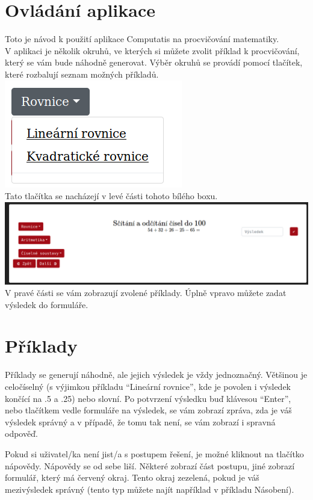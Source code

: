 \documentclass[
]{article}
\begin{document}
\section{Ovládání aplikace}
Toto je návod k použití aplikace Computatis na procvičování matematiky.\\
V aplikaci je několik okruhů, ve kterých si můžete zvolit příklad k
procvičování, který se vám bude náhodně generovat. Výběr okruhů se
provádí pomocí tlačítek, které rozbalují seznam možných příkladů.\\
\includegraphics{../../doc-images/dropdown.png}\\
Tato tlačítka se nacházejí v
levé části tohoto bílého boxu.\\
\includegraphics{../../doc-images/WhiteBox.png}\\
V pravé části se vám zobrazují zvolené příklady. Úplně vpravo můžete
zadat výsledek do formuláře.
\section{Příklady}
Příklady se generují náhodně, ale jejich výsledek je vždy jednoznačný.
Většinou je celočíselný (s výjimkou příkladu ``Lineární rovnice'', kde
je povolen i výsledek končící na .5 a .25) nebo slovní. Po potvrzení
výsledku buď klávesou ``Enter'', nebo tlačítkem vedle formuláře na
výsledek, se vám zobrazí zpráva, zda je váš výsledek správný a v
případě, že tomu tak není, se vám zobrazí i spravná odpověď.

Pokud si uživatel/ka není jist/a s postupem řešení, je možné kliknout na
tlačítko nápovědy. Nápovědy se od sebe liší. Některé zobrazí část
postupu, jiné zobrazí formulář, který má červený okraj. Tento okraj
zezelená, pokud je váš mezivýsledek správný (tento typ můžete najít
například v příkladu Násobení).
\end{document}
